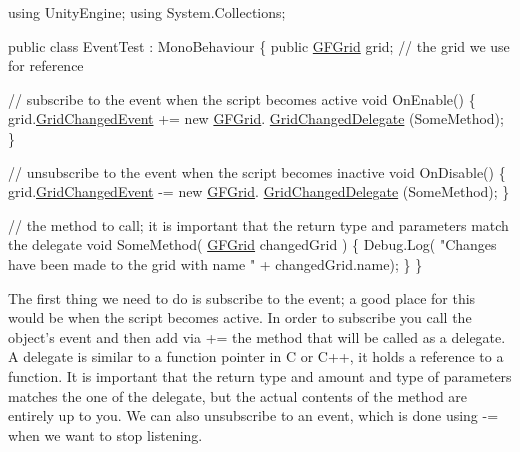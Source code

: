 \begin{DoxyCode}
\textcolor{keyword}{using} UnityEngine;
\textcolor{keyword}{using} System.Collections;

\textcolor{keyword}{public} \textcolor{keyword}{class }EventTest : MonoBehaviour \{
    \textcolor{keyword}{public} \hyperlink{class_g_f_grid}{GFGrid} grid; \textcolor{comment}{// the grid we use for reference}

    \textcolor{comment}{// subscribe to the event when the script becomes active}
    \textcolor{keywordtype}{void} OnEnable() \{
        grid.\hyperlink{class_g_f_grid_af3bfbed41ba24f963e871921c663f1f8_af3bfbed41ba24f963e871921c663f1f8}{GridChangedEvent} += \textcolor{keyword}{new} \hyperlink{class_g_f_grid}{GFGrid}.
      \hyperlink{class_g_f_grid_a1b011f573c51561fbd9e411f821ba820_a1b011f573c51561fbd9e411f821ba820}{GridChangedDelegate} (SomeMethod);
    \}
    
    \textcolor{comment}{// unsubscribe to the event when the script becomes inactive}
    \textcolor{keywordtype}{void} OnDisable() \{
        grid.\hyperlink{class_g_f_grid_af3bfbed41ba24f963e871921c663f1f8_af3bfbed41ba24f963e871921c663f1f8}{GridChangedEvent} -= \textcolor{keyword}{new} \hyperlink{class_g_f_grid}{GFGrid}.
      \hyperlink{class_g_f_grid_a1b011f573c51561fbd9e411f821ba820_a1b011f573c51561fbd9e411f821ba820}{GridChangedDelegate} (SomeMethod);
    \}

    \textcolor{comment}{// the method to call; it is important that the return type and parameters match the delegate}
    \textcolor{keywordtype}{void} SomeMethod( \hyperlink{class_g_f_grid}{GFGrid} changedGrid ) \{
        Debug.Log( \textcolor{stringliteral}{"Changes have been made to the grid with name "} + changedGrid.name);
    \}
\}
\end{DoxyCode}


The first thing we need to do is subscribe to the event; a good place for this would be when the script becomes active. In order to subscribe you call the object's event and then add via {\ttfamily +=} the method that will be called as a delegate. A delegate is similar to a function pointer in C or C++, it holds a reference to a function. It is important that the return type and amount and type of parameters matches the one of the delegate, but the actual contents of the method are entirely up to you. We can also unsubscribe to an event, which is done using {\ttfamily -\/=} when we want to stop listening. 